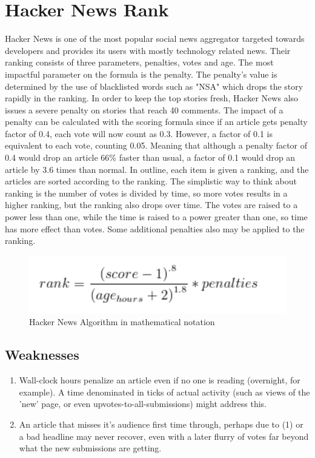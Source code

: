 \section{Hacker News Rank}
Hacker News is one of the most popular social news aggregator targeted towards developers and provides its users with mostly technology related news. Their ranking consists of three parameters, penalties, votes and age. The most impactful parameter on the formula is the penalty. The penalty's value is determined by the use of blacklisted words such as "NSA" which drops the story rapidly in the ranking. In order to keep the top stories fresh, Hacker News also issues a severe penalty on stories that reach 40 comments. The impact of a penalty can be calculated with the scoring formula since if an article gets penalty factor of 0.4, each vote will now count as 0.3. However, a factor of 0.1 is equivalent to each vote, counting 0.05. Meaning that although a penalty factor of 0.4 would drop an article 66\% faster than usual, a factor of  0.1 would drop an article by 3.6 times than normal. In outline, each item is given a ranking, and the articles are sorted according to the ranking. The simplistic way to think about ranking is the number of votes is divided by time, so more votes results in a higher ranking, but the ranking also drops over time. The votes are raised to a power less than one, while the time is raised to a power greater than one, so time has more effect than votes. Some additional penalties also may be applied to the ranking.

\begin{figure}
  \centering
	\includegraphics{Figures/hacker_news_rank}
\caption{Hacker News Algorithm in mathematical notation}
\end{figure}

\subsection {Weaknesses}
\begin{enumerate}
  \item Wall-clock hours penalize an article even if no one is reading (overnight, for example). A time denominated in ticks of actual activity (such as views of the 'new' page, or even upvotes-to-all-submissions) might address this.
  \item An article that misses it's audience first time through, perhaps due to (1) or a bad headline may never recover, even with a later flurry of votes far beyond what the new submissions are getting.
\end{enumerate}

